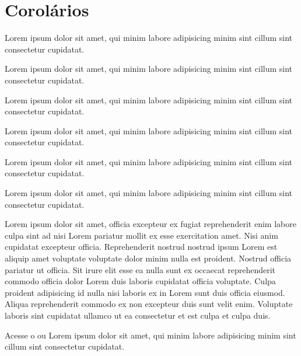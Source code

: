 \documentclass[12pt]{../libellum}
\begin{document}
  \section{Corolários}

  \begin{cor}
    Lorem ipsum dolor sit amet, qui minim labore adipisicing minim sint cillum sint consectetur cupidatat.
  \end{cor}

  Lorem ipsum dolor sit amet, qui minim labore adipisicing minim sint cillum sint consectetur cupidatat.

  \begin{lema}
    Lorem ipsum dolor sit amet, qui minim labore adipisicing minim sint cillum sint consectetur cupidatat.
  \end{lema}

 \begin{teorema}
   Lorem ipsum dolor sit amet, qui minim labore adipisicing minim sint cillum sint consectetur cupidatat.
 \end{teorema}

Lorem ipsum dolor sit amet, qui minim labore adipisicing minim sint cillum sint consectetur cupidatat.
  \begin{definicao}
    Lorem ipsum dolor sit amet, qui minim labore adipisicing minim sint cillum sint consectetur cupidatat.
  \end{definicao}

  Lorem ipsum dolor sit amet, officia excepteur ex fugiat reprehenderit enim labore culpa sint ad nisi Lorem pariatur mollit ex esse exercitation amet. Nisi anim cupidatat excepteur officia. Reprehenderit nostrud nostrud ipsum Lorem est aliquip amet voluptate voluptate dolor minim nulla est proident. Nostrud officia pariatur ut officia. Sit irure elit esse ea nulla sunt ex occaecat reprehenderit commodo officia dolor Lorem duis laboris cupidatat officia voluptate. Culpa proident adipisicing id nulla nisi laboris ex in Lorem sunt duis officia eiusmod. Aliqua reprehenderit commodo ex non excepteur duis sunt velit enim. Voluptate laboris sint cupidatat ullamco ut ea consectetur et est culpa et culpa duis.

  Acesse o  ou Lorem ipsum dolor sit amet, qui minim labore adipisicing minim sint cillum sint consectetur cupidatat.
  \begin{center}
  \end{center}
\end{document}
